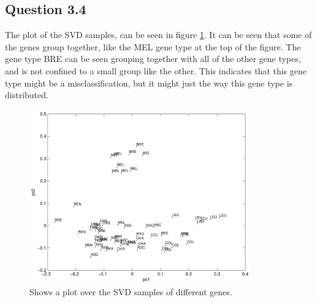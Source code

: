 \subsection*{Question 3.4}
The plot of the SVD samples, can be seen in figure \ref{fig:q34}. It can be seen that some of the genes group together, like the MEL gene type at the top of the figure. The gene type BRE can be seen grouping together with all of the other gene types, and is not confined to a small group like the other. This indicates that this gene type might be a misclassification, but it might just the way this gene type is distributed.

\begin{figure}[!htbp]
  \centering
  \includegraphics[width=0.85\textwidth]{./images/q34cancer}
  \caption{Shows a plot over the SVD samples of different genes.}
  \label{fig:q34}
\end{figure}
